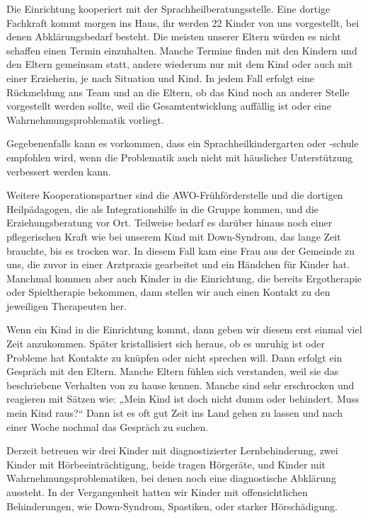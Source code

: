 Die Einrichtung kooperiert mit der Sprachheilberatungsstelle. Eine dortige Fachkraft kommt morgen ins Haus, ihr werden 22 Kinder von uns vorgestellt, bei denen Abklärungsbedarf besteht. Die meisten unserer Eltern würden es nicht schaffen einen Termin einzuhalten. Manche Termine finden mit den Kindern und den Eltern gemeinsam statt, andere wiederum nur mit dem Kind oder auch mit einer Erzieherin, je nach Situation und Kind. In jedem Fall erfolgt eine Rückmeldung ans Team und an die Eltern, ob das Kind noch an anderer Stelle vorgestellt werden sollte, weil die Gesamtentwicklung auffällig ist oder eine Wahrnehmungsproblematik vorliegt. 

Gegebenenfalls kann es vorkommen, dass ein Sprachheilkindergarten oder -schule empfohlen wird, wenn die Problematik auch nicht mit häuslicher Unterstützung verbessert werden kann. 

Weitere Kooperationspartner sind die AWO-Frühförderstelle und die dortigen Heilpädagogen, die als Integrationshilfe in die Gruppe kommen, und die Erziehungsberatung vor Ort. Teilweise bedarf es darüber hinaus noch einer pflegerischen Kraft wie bei unserem Kind mit Down-Syndrom, das lange Zeit brauchte, bis es trocken war. In diesem Fall kam eine Frau aus der Gemeinde zu uns, die zuvor in einer Arztpraxis gearbeitet und ein Händchen für Kinder hat.
Manchmal kommen aber auch Kinder in die Einrichtung, die bereits Ergotherapie oder Spieltherapie bekommen, dann stellen wir auch einen Kontakt zu den jeweiligen Therapeuten her. 

Wenn ein Kind in die Einrichtung kommt, dann geben wir diesem erst einmal viel Zeit anzukommen. Später kristallisiert sich heraus, ob es unruhig ist oder Probleme hat Kontakte zu knüpfen oder nicht sprechen will. Dann erfolgt ein Gespräch mit den Eltern. Manche Eltern fühlen sich verstanden, weil sie das beschriebene Verhalten von zu hause kennen. Manche sind sehr erschrocken und reagieren mit Sätzen wie: „Mein Kind ist doch nicht dumm oder behindert. Muss mein Kind raus?“ Dann ist es oft gut Zeit ins Land gehen zu lassen und nach einer Woche nochmal das Gespräch zu suchen.

Derzeit betreuen wir drei Kinder mit diagnostizierter Lernbehinderung, zwei Kinder mit Hörbeeinträchtigung, beide tragen Hörgeräte, und Kinder mit Wahrnehmungsproblematiken, bei denen noch eine diagnostische Abklärung aussteht. In der Vergangenheit hatten wir Kinder mit offensichtlichen Behinderungen, wie Down-Syndrom, Spastiken, oder starker Hörschädigung.

